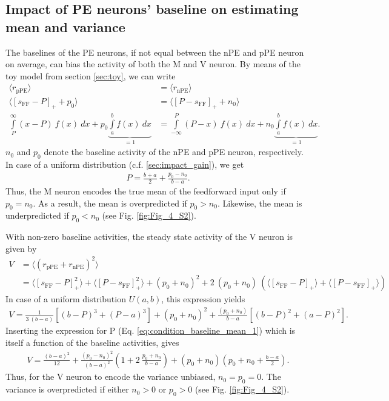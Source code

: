 \documentclass[10pt,a4paper]{article}
\begin{document}
\subsection{Impact of PE neurons' baseline on estimating mean and variance}\label{sec:impact_baseline} 
%
The baselines of the PE neurons, if not equal between the nPE and pPE neuron on average, can bias the activity of both the M and V neuron. By means of the toy model from section \ref{sec:toy}, we can write
%
\begin{align}
\label{eq:condition_baseline_mean}
\langle r_\mathrm{pPE} \rangle &= \langle r_\mathrm{nPE} \rangle \\
\langle \left[s_\mathrm{FF} - P\right]_+ + p_0\rangle &= \langle \left[P - s_\mathrm{FF}\right]_+ + n_0\rangle \nonumber\\
\int\limits_P^\infty (x - P)\ f(x)\ dx + p_0 \underbrace{\int\limits_a^b f(x)\ dx}_{=1}  &= \int\limits_{-\infty}^P (P - x)\ f(x)\ dx + n_0 \underbrace{\int\limits_a^b f(x)\ dx}_{=1} . \nonumber
\end{align}
%
$n_0$ and $p_0$ denote the baseline activity of the nPE and pPE neuron, respectively.
In case of a uniform distribution (c.f. \ref{sec:impact_gain}), we get 
%
%
\begin{align}
\label{eq:condition_baseline_mean_1}
P = \frac{b+a}{2} + \frac{p_0 - n_0}{b-a}.
\end{align}
%
Thus, the M neuron encodes the true mean of the feedforward input only if $p_0 = n_0$. As a result, the mean is overpredicted if $p_0 > n_0$. Likewise, the mean is underpredicted if $p_0 < n_0$ (see Fig. \ref{fig:Fig_4_S2}).

With non-zero baseline activities, the steady state activity of the V neuron is given by
%
\begin{align}
\label{eq:condition_baseline_variance}
V &= \langle \left( r_\mathrm{pPE} + r_\mathrm{nPE} \right)^2 \rangle \\
&= \langle \left[ s_\mathrm{FF}-P\right]_+^2\rangle + \langle \left[ P-s_\mathrm{FF}\right]_+^2\rangle + (p_0 + n_0)^2 + 2\ (p_0 + n_0)\ \left( \langle \left[ s_\mathrm{FF}-P\right]_+\rangle + \langle \left[ P-s_\mathrm{FF}\right]_+ \rangle\right) \nonumber
\end{align}
%
In case of a uniform distribution $U(a,b)$, this expression yields
%
\begin{align}
\label{eq:condition_baseline_variance_1}
V = \frac{1}{3\ (b-a)} \left[ (b-P)^3 + (P-a)^3\right] + (p_0 + n_0)^2 + \frac{(p_0 + n_0)}{b-a} \left[ (b-P)^2 + (a-P)^2\right].
\end{align}
%
Inserting the expression for P (Eq. \ref{eq:condition_baseline_mean_1}) which is itself a function of the baseline activities, gives
%
\begin{align}
\label{eq:condition_baseline_variance_2}
V =  \frac{(b-a)^2}{12} + \frac{(p_0-n_0)^2}{(b-a)^2} \left( 1 + 2\ \frac{p_0+n_0}{b-a}\right) + (p_0 + n_0) \left( p_0 + n_0 + \frac{b-a}{2}\right).
\end{align}
%
Thus, for the V neuron to encode the variance unbiased, $n_0 = p_0 = 0$. The variance is overpredicted if either $n_0 > 0$ or $p_0 > 0$ (see Fig. \ref{fig:Fig_4_S2}).
\end{document}
